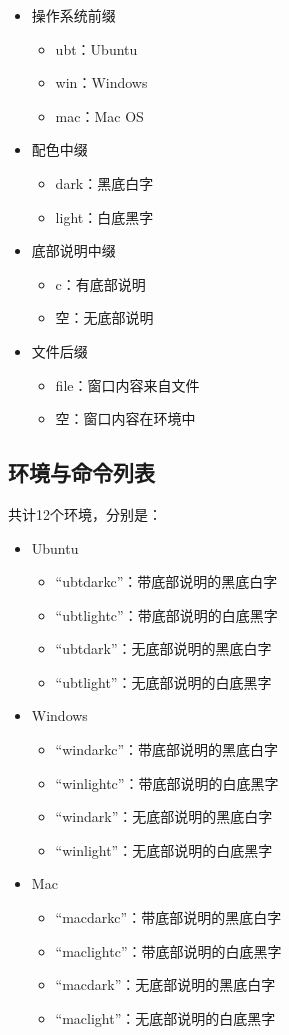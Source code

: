 \documentclass{ctexart}
\newcommand{\qtmark}[1]{``#1''}
\begin{document}
\begin{itemize}
\item 操作系统前缀
  \begin{itemize}
  \item ubt：Ubuntu
  \item win：Windows
  \item mac：Mac OS
  \end{itemize}
\item 配色中缀
  \begin{itemize}
  \item dark：黑底白字
  \item light：白底黑字
  \end{itemize}
\item 底部说明中缀
  \begin{itemize}
  \item c：有底部说明
  \item 空：无底部说明
  \end{itemize}
\item 文件后缀
  \begin{itemize}
  \item file：窗口内容来自文件
  \item 空：窗口内容在环境中
  \end{itemize}
\end{itemize}
\subsection{环境与命令列表}
共计12个环境，分别是：
\begin{itemize}
\item Ubuntu
  \begin{itemize}
  \item \qtmark{ubtdarkc}：带底部说明的黑底白字
  \item \qtmark{ubtlightc}：带底部说明的白底黑字
  \item \qtmark{ubtdark}：无底部说明的黑底白字
  \item \qtmark{ubtlight}：无底部说明的白底黑字
  \end{itemize}
\item Windows
  \begin{itemize}
  \item \qtmark{windarkc}：带底部说明的黑底白字
  \item \qtmark{winlightc}：带底部说明的白底黑字
  \item \qtmark{windark}：无底部说明的黑底白字
  \item \qtmark{winlight}：无底部说明的白底黑字
  \end{itemize}
\item Mac
  \begin{itemize}
  \item \qtmark{macdarkc}：带底部说明的黑底白字
  \item \qtmark{maclightc}：带底部说明的白底黑字
  \item \qtmark{macdark}：无底部说明的黑底白字
  \item \qtmark{maclight}：无底部说明的白底黑字
  \end{itemize}
\end{itemize}
\end{document}

